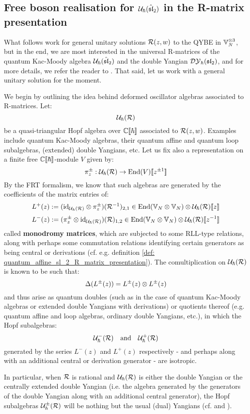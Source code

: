     \subsection{\texorpdfstring{Free boson realisation for $\mathcal{U}_{\hbar}(\hat{\mathfrak{sl}}_2)$ in the R-matrix presentation}{}}
        What follows work for general unitary solutions $\mathcal{R}(z, w)$ to the QYBE in $\bbV_N^{\tensor 3}$, but in the end, we are most interested in the universal R-matrices of the quantum Kac-Moody algebra $\mathcal{U}_{\hbar}(\hat{\mathfrak{sl}}_2)$ and the double Yangian $\mathcal{DY}_{\hbar}(\mathfrak{sl}_2)$, and for more details, we refer the reader to \cite{ragoucy_vertex_representations_of_R_matrix_quantum_groups}. That said, let us work with a general unitary solution for the moment.
    
        We begin by outlining the idea behind deformed oscillator algebras associated to R-matrices. Let:
            $$\mathcal{U}_{\hbar}(\mathcal{R})$$
        be a quasi-triangular Hopf algebra over $\mathbb{C}[\![\hbar]\!]$ associated to $\mathcal{R}(z, w)$. Examples include quantum Kac-Moody algebras, their quantum affine and quantum loop subalgebras, (extended) double Yangians, etc. Let us fix also a representation on a finite free $\mathbb{C}[\![\hbar]\!]$-module $V$ given by:
            $$\pi_z^{\pm}: \mathcal{U}_{\hbar}(\mathcal{R}) \to \operatorname{End}(V)[\![z^{\pm 1}]\!]$$
        By the FRT formalism, we know that such algebras are generated by the coefficients of the matrix entries of:
            $$L^+(z) := (\id_{\calU_{\hbar}(\calR)} \tensor \pi_z^{\pm})( \calR^{-1} )_{2, 1} \in \End(\bbV_N \tensor \bbV_N) \tensor \calU_{\hbar}(\calR)[\![z]\!]$$
            $$L^-(z) := (\pi_z^{\pm} \tensor \id_{\calU_{\hbar}(\calR)})( \calR )_{1, 2} \in \End(\bbV_N \tensor \bbV_N) \tensor \calU_{\hbar}(\calR)[\![z^{-1}]\!]$$
        called \textbf{monodromy matrices}, which are subjected to some RLL-type relations, along with perhaps some commutation relations identifying certain generators as being central or derivations (cf. e.g. definition \ref{def: quantum_affine_sl_2_R_matrix_presentation}). The comultiplication on $\mathcal{U}_{\hbar}(\mathcal{R})$ is known to be such that:
            $$\Delta( L^{\pm}(z) ) = L^{\pm}(z) \tensor L^{\pm}(z)$$
        and thus arise as quantum doubles (such as in the case of quantum Kac-Moody algebras or extended double Yangians with derivations) or quotients thereof (e.g. quantum affine and loop algebras, ordinary double Yangians, etc.), in which the Hopf subalgebras:
            $$\mathcal{U}_{\hbar}^-(\mathcal{R}) \quad \text{and} \quad \mathcal{U}_{\hbar}^+(\mathcal{R})$$
        generated by the series $L^-(z)$ and $L^+(z)$ respectively - and perhaps along with an additional central or derivation generator - are isotropic.
        \begin{example}
            In particular, when $\mathcal{R}$ is rational and $\mathcal{U}_{\hbar}(\mathcal{R})$ is either the double Yangian or the centrally extended double Yangian (i.e. the algebra generated by the generators of the double Yangian along with an additional central generator), the Hopf subalgebras $\mathcal{U}_{\hbar}^{\pm}(\mathcal{R})$ will be nothing but the usual (dual) Yangians (cf. \cite[Chapter 1]{molev_yangians_and_classical_lie_algebras} and \cite[Chapter 10]{molev_sugawara_operators_for_classical_lie_algebras}).
        \end{example}

